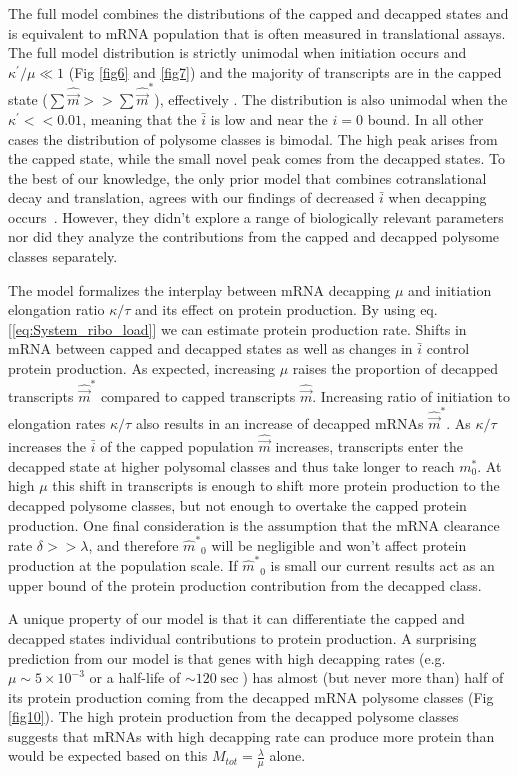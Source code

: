 \documentclass[10pt,letterpaper]{article}
\newcommand{\kappaprime}{\ensuremath{\kappa^{\prime}}\xspace}
\newcommand{\mhat}{\ensuremath{\hat{m}}\xspace}
\newcommand{\mhatstar}{\ensuremath{\mhat^{*}}\xspace}
\newcommand{\mvec}{\ensuremath{\vec{m}}\xspace}
\newcommand{\mvechat}{\ensuremath{\hat{\mvec}}\xspace}
\newcommand{\mvechatstar}{\ensuremath{\mvechat^*}\xspace}
\newcommand{\MRL}{\ensuremath{\bar{i}}\xspace}
\begin{document}
The full model combines the distributions of the capped and decapped states and is equivalent to mRNA population that is often measured in translational assays.
The full model distribution is strictly unimodal when initiation occurs and $\kappaprime/\mu \ll 1$ (Fig \ref{fig6} and \ref{fig7}) and the majority of transcripts are in the capped state ($\sum \mvechat >> \sum \mvechatstar$), effectively .
The distribution is also unimodal when the $\kappaprime << 0.01$, meaning that the \MRL is low and near the $i=0$ bound. 
In all other cases the distribution of polysome classes is bimodal. The high peak arises from the capped state, while the small novel  peak comes from the decapped states. 
To the best of our knowledge, the only prior model that combines cotranslational decay and translation, agrees with our findings of decreased \MRL when decapping occurs~\cite{RN22}. However, they didn't explore a range of biologically relevant parameters nor did they analyze the contributions from the capped and decapped polysome classes separately.

The model formalizes the interplay between mRNA decapping $\mu$ and initiation elongation ratio $\kappa/\tau$ and its effect on protein production.
By using eq.  [\ref{eq:System_ribo_load}] we can estimate protein production rate.
Shifts in mRNA between capped and decapped states as well as changes in \MRL control protein production.
As expected, increasing $\mu$ raises the proportion of decapped transcripts \mvechatstar compared to capped transcripts \mvechat.
Increasing ratio of initiation to elongation rates $\kappa/\tau$ also results in an increase of decapped mRNAs \mvechatstar.
As $\kappa/\tau$ increases the \MRL of the capped population \mvechat increases, transcripts enter the decapped state at higher polysomal classes and thus take longer to reach $m_0^*$.
At high $\mu$ this shift in transcripts is enough to shift more protein production to the decapped polysome classes, but not enough to overtake the capped protein production.
One final consideration is the assumption that the mRNA clearance rate $\delta >> \lambda$, and therefore $\mhatstar_0$ will be negligible and won't affect protein production at the population scale. If $\mhatstar_0$ is small our current results act as an upper bound of the protein production contribution from the decapped class. 


A unique property of our model is that it can differentiate the capped and decapped states individual contributions to protein production. 
A surprising prediction from our model is that genes with  high decapping rates (e.g. $\mu  \sim 5 \times 10^{-3}$ or a half-life of $\sim 120 \sec$) has almost (but never more than) half of its protein production coming from the decapped mRNA polysome classes (Fig \ref{fig10}).
The high protein production from the decapped polysome classes suggests that mRNAs with high decapping rate can produce more protein than would be expected based on this $M_{tot} = \frac{\lambda}{\mu}$ alone. 
\end{document}
